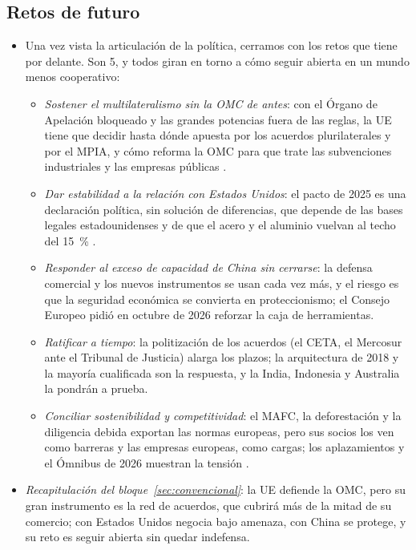 \documentclass[11pt]{article}
\begin{document}
\subsection{Retos de futuro}\label{sec:retos}

\begin{itemize}
\item Una vez vista la articulación de la política, cerramos con los retos que tiene por delante. Son 5, y todos giran en torno a cómo seguir abierta en un mundo menos cooperativo:
  \begin{itemize}
  \item \emph{Sostener el multilateralismo sin la OMC de antes}: con el Órgano de Apelación bloqueado y las grandes potencias fuera de las reglas, la UE tiene que decidir hasta dónde apuesta por los acuerdos plurilaterales y por el MPIA, y cómo reforma la OMC para que trate las subvenciones industriales y las empresas públicas .
  \item \emph{Dar estabilidad a la relación con Estados Unidos}: el pacto de 2025 es una declaración política, sin solución de diferencias, que depende de las bases legales estadounidenses y de que el acero y el aluminio vuelvan al techo del 15~\% .
  \item \emph{Responder al exceso de capacidad de China sin cerrarse}: la defensa comercial y los nuevos instrumentos se usan cada vez más, y el riesgo es que la seguridad económica se convierta en proteccionismo; el Consejo Europeo pidió en octubre de 2026 reforzar la caja de herramientas\nocite{CEU2026ConclusionesOctubre}.
  \item \emph{Ratificar a tiempo}: la politización de los acuerdos (el CETA, el Mercosur ante el Tribunal de Justicia) alarga los plazos; la arquitectura de 2018 y la mayoría cualificada son la respuesta, y la India, Indonesia y Australia la pondrán a prueba.
  \item \emph{Conciliar sostenibilidad y competitividad}: el MAFC, la deforestación y la diligencia debida exportan las normas europeas, pero sus socios los ven como barreras y las empresas europeas, como cargas; los aplazamientos y el Ómnibus de 2026 muestran la tensión .
  \end{itemize}
\item \emph{Recapitulación del bloque~\ref{sec:convencional}}: la UE defiende la OMC, pero su gran instrumento es la red de acuerdos, que cubrirá más de la mitad de su comercio; con Estados Unidos negocia bajo amenaza, con China se protege, y su reto es seguir abierta sin quedar indefensa.
\end{itemize}
\end{document}
